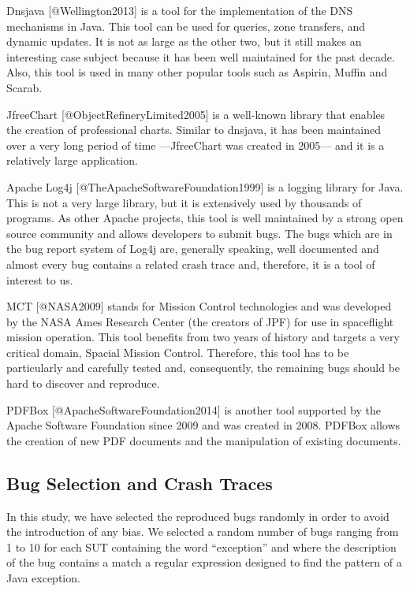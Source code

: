 Dnsjava {[}@Wellington2013{]} is a tool for the implementation of the
DNS mechanisms in Java. This tool can be used for queries, zone
transfers, and dynamic updates. It is not as large as the other two, but
it still makes an interesting case subject because it has been well
maintained for the past decade. Also, this tool is used in many other
popular tools such as Aspirin, Muffin and Scarab.

JfreeChart {[}@ObjectRefineryLimited2005{]} is a well-known library that
enables the creation of professional charts. Similar to dnsjava, it has
been maintained over a very long period of time ---JfreeChart was
created in 2005--- and it is a relatively large application.

Apache Log4j {[}@TheApacheSoftwareFoundation1999{]} is a logging library
for Java. This is not a very large library, but it is extensively used
by thousands of programs. As other Apache projects, this tool is well
maintained by a strong open source community and allows developers to
submit bugs. The bugs which are in the bug report system of Log4j are,
generally speaking, well documented and almost every bug contains a
related crash trace and, therefore, it is a tool of interest to us.

MCT {[}@NASA2009{]} stands for Mission Control technologies and was
developed by the NASA Ames Research Center (the creators of JPF) for use
in spaceflight mission operation. This tool benefits from two years of
history and targets a very critical domain, Spacial Mission Control.
Therefore, this tool has to be particularly and carefully tested and,
consequently, the remaining bugs should be hard to discover and
reproduce.

PDFBox {[}@ApacheSoftwareFoundation2014{]} is another tool supported by
the Apache Software Foundation since 2009 and was created in 2008.
PDFBox allows the creation of new PDF documents and the manipulation of
existing documents.

\subsection{Bug Selection and Crash
Traces}\label{bug-selection-and-crash-traces}

In this study, we have selected the reproduced bugs randomly in order to
avoid the introduction of any bias. We selected a random number of bugs
ranging from 1 to 10 for each SUT containing the word ``exception'' and
where the description of the bug contains a match a regular expression
designed to find the pattern of a Java exception.

